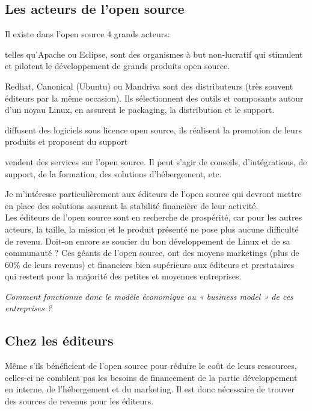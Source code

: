 		\subsection{Les acteurs de l'open source}
			Il existe dans l'open source 4 grands acteurs:

			\begin{description}[font=\color{burntorange}]
				\item[Les fondations:] telles qu'Apache ou Eclipse, sont des organismes à but non-lucratif qui stimulent et pilotent le développement de grands produits open source.
				\item[Les distributeurs:] Redhat, Canonical (Ubuntu) ou Mandriva sont des distributeurs (très souvent éditeurs par la même occasion). Ils sélectionnent des outils et composants autour d'un noyau Linux, en assurent le packaging, la distribution et le support.
				\item[Les éditeurs:] diffusent des logiciels sous licence open source, ils réalisent la promotion de leurs produits et proposent du support
				\item[Les prestataires : ] vendent des services sur l'open source. Il peut s'agir de conseils, d'intégrations, de support, de la formation, des solutions d'hébergement, etc.
			\end{description}

			Je m'intéresse particulièrement aux éditeurs de l'open source qui devront mettre en place des solutions assurant la stabilité financière de leur activité.\\

			 Les éditeurs de l'open source sont en recherche de prospérité, car pour les autres acteurs, la taille, la mission et le produit présenté ne pose plus aucune difficulté de revenu. Doit-on encore se soucier du bon développement de Linux et de sa communauté ? Ces géants de l'open source, ont des moyens marketings (plus de 60\% de leurs revenus) et financiers bien supérieurs aux éditeurs et prestataires qui restent pour la majorité des petites et moyennes entreprises.

			\emph{Comment fonctionne donc le modèle économique ou « business model » de ces entreprises ?}\\

		\subsection{Chez les éditeurs}

			Même s'ils bénéficient de l'open source pour réduire le coût de leurs ressources, celles-ci ne comblent pas les besoins de financement de la partie développement en interne, de l'hébergement et du marketing. Il est donc nécessaire de trouver des sources de revenus pour les éditeurs.


